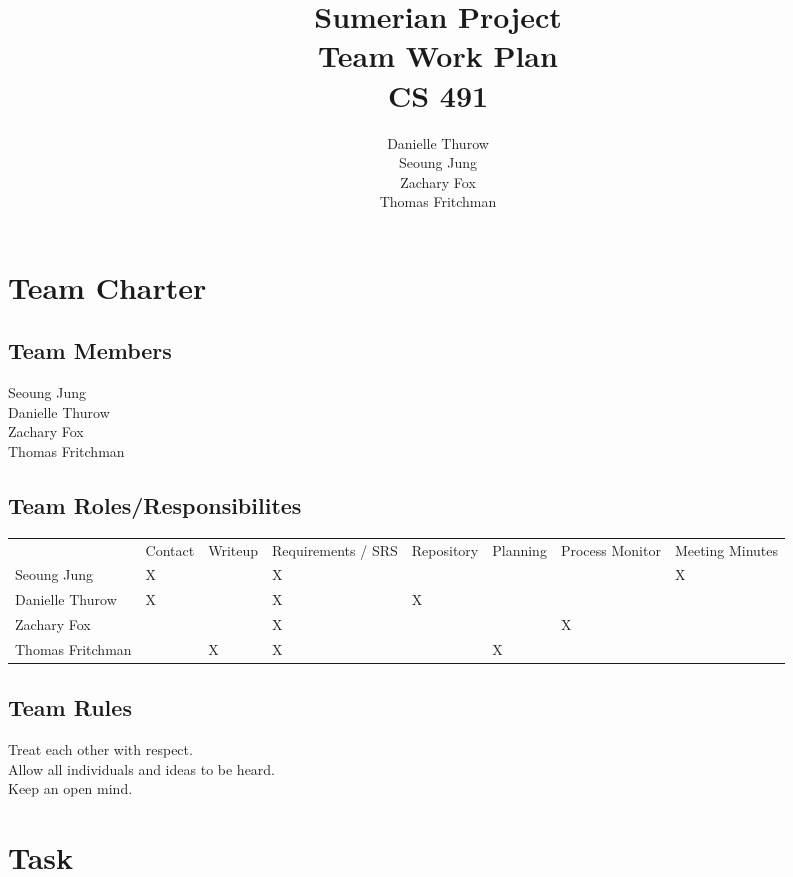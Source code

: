 \documentclass[11pt]{article}
\title{Sumerian Project\\
		Team Work Plan\\
		CS 491}
\author{Danielle Thurow \\
		  Seoung Jung\\
		  Zachary Fox\\
		  Thomas Fritchman}
\date{}
\begin{document}
\maketitle
\newpage

\section{Team Charter}
\subsection{Team Members}
Seoung Jung\\
Danielle Thurow\\
Zachary Fox\\
Thomas Fritchman\\

\subsection{Team Roles/Responsibilites}
\begin{tabular}{|l|l|l|l|l|l|l|l|}
    \hline
    & Contact & Writeup & Requirements / SRS & Repository & Planning & Process Monitor & Meeting Minutes\\
    Seoung Jung             & X &   & X &   &   &   & X \\
    Danielle Thurow         & X &   & X & X &   &   &   \\
    Zachary Fox             &   &   & X &   &   & X &   \\
    Thomas Fritchman        &   & X & X &   & X &   &   \\
    \hline
\end{tabular}
    
\subsection{Team Rules}
Treat each other with respect.\\
Allow all individuals and ideas to be heard.\\
Keep an open mind.\\



\section{Task}
\end{document}
